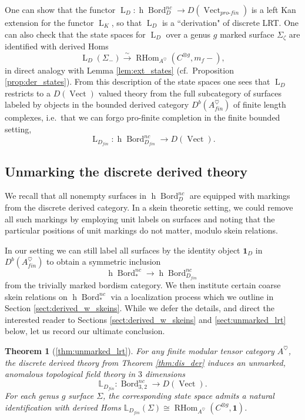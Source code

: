 \documentclass[reqno]{amsart}
\newtheorem*{theoremA}{Theorem}
\theoremstyle{definition}
\newcommand{\mbb}[1]{\mathbb{#1}}
\newcommand{\opn}[1]{\operatorname{#1}}
\newcommand{\ot}{\otimes}
\newcommand{\pf}{pro\text{-}fin}
\DeclareMathOperator{\Bord}{Bord}
\renewcommand{\1}{\mathbf{1}}
\begin{document}
One can show that the functor $\opn{L}_D:\opn{h}\Bord_D^{nc}\to D(\opn{Vect}_{\pf})$ is a left Kan extension for the functor $\opn{L}_K$, so that $\opn{L}_D$ is a ``derivation" of discrete LRT. One can also check that the state spaces for $\opn{L}_D$ over a genus $g$ marked surface $\Sigma_{\zeta}$ are identified with derived Homs
\[
\opn{L}_D(\Sigma_-)\overset{\sim}\to \opn{RHom}_{A^{\heartsuit}}(C^{\ot g},m_f-),
\]
in direct analogy with Lemma \ref{lem:ext_states} (cf.\ Proposition \ref{prop:der_states}). From this description of the state spaces one sees that $\opn{L}_D$ restricts to a $D(\opn{Vect})$ valued theory from the full subcategory of surfaces labeled by objects in the bounded derived category $D^b(A^{\heartsuit}_{fin})$ of finite length complexes, i.e.\ that we can forgo pro-finite completion in the finite bounded setting,
\[
\opn{L}_{D_{fin}}:\opn{h}\Bord^{nc}_{D_{fin}}\to D(\opn{Vect}).
\]

\subsection{Unmarking the discrete derived theory}
\label{sect:pre_unmark}

We recall that all nonempty surfaces in $\opn{h}\Bord_D^{nc}$ are equipped with markings from the discrete derived category. In a skein theoretic setting, we could remove all such markings by employing unit labels on surfaces and noting that the particular positions of unit markings do not matter, modulo skein relations.
\par

In our setting we can still label all surfaces by the identity object $\1_D$ in $D^b(A^{\heartsuit}_{fin})$ to obtain a symmetric inclusion
\[
\opn{h}\Bord^{nc}_{\ast}\to \opn{h}\Bord_{D_{fin}}^{nc}
\]
from the trivially marked bordism category. We then institute certain coarse skein relations on $\opn{h}\Bord^{nc}_{\ast}$ via a localization process which we outline in Section \ref{sect:derived_w_skeins}. While we defer the details, and direct the interested reader to Sections \ref{sect:derived_w_skeins} and \ref{sect:unmarked_lrt} below, let us record our ultimate conclusion.

\begin{theoremA}[\ref{thm:unmarked_lrt}]
For any finite modular tensor category $A^{\heartsuit}$, the discrete derived theory from Theorem \ref{thm:dis_der} induces an unmarked, anomalous topological field theory in $3$ dimensions
\[
\mbb{L}_{D_{fin}}:\Bord^{nc}_{3,2}\to D(\opn{Vect}).
\]
For each genus $g$ surface $\Sigma$, the corresponding state space admits a natural identification with derived Homs $\mbb{L}_{D_{fin}}(\Sigma)\cong \opn{RHom}_{A^{\heartsuit}}(C^{\ot g},\1)$.
\end{theoremA}
\end{document}
